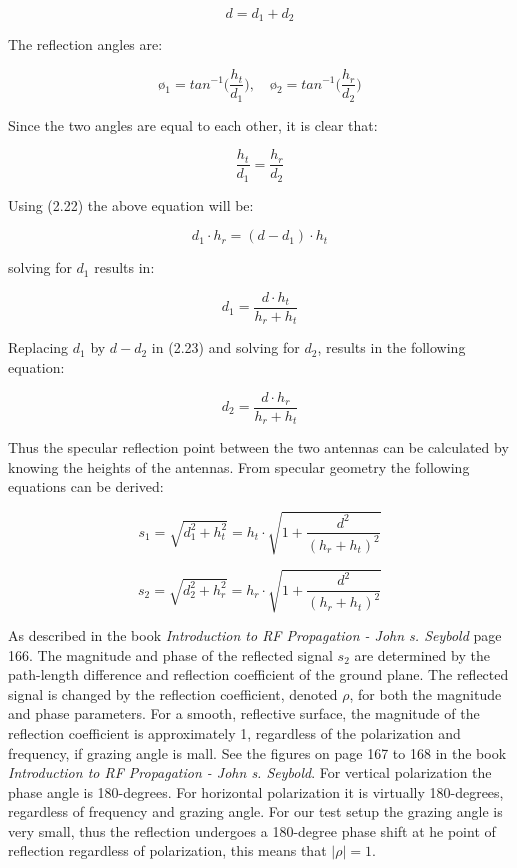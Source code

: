 \begin{equation}
  d = d_1 + d_2
\end{equation}

The reflection angles are:

$$ø_1 = tan^{-1}\Big(\frac{h_t}{d_1}\Big), \quad ø_2 = tan^{-1}\Big(\frac{h_r}{d_2}\Big)$$

Since the two angles are equal to each other, it is clear that: 

$$\frac{h_t}{d_1} = \frac{h_r}{d_2}$$

Using (2.22) the above equation will be:

\begin{equation}
  d_1 \cdot h_r = (d-d_1) \cdot h_t
\end{equation}

solving for $d_1$ results in:

\begin{equation}
  d_1 = \frac{d \cdot h_t}{h_r + h_t}
\end{equation}

Replacing $d_1$ by $d - d_2$ in (2.23) and solving for $d_2$, results in the following equation:

\begin{equation}
  d_2 = \frac{d \cdot h_r}{h_r + h_t}
\end{equation}

Thus the specular reflection point between the two antennas can be calculated by knowing the heights of the antennas. From specular geometry the following equations can be derived: 

\begin{equation}
  s_1 = \sqrt{d_1^2 + h_t^2} = h_t \cdot \sqrt{1 + \frac{d^2}{(h_r + h_t)^2}}
\end{equation}

\begin{equation}
  s_2 = \sqrt{d_2^2 + h_r^2} = h_r \cdot \sqrt{1 + \frac{d^2}{(h_r + h_t)^2}}
\end{equation}

As described in the book \textit{Introduction to RF Propagation - John s. Seybold}\cite{RFpropagation} page 166. The magnitude and phase of the reflected signal $s_2$ are determined by the path-length difference and reflection coefficient of the ground plane. The reflected signal is changed by the reflection coefficient, denoted $\rho$, for both the magnitude and phase parameters. For a smooth, reflective surface, the magnitude of the reflection coefficient is approximately 1, regardless of the polarization and frequency, if grazing angle is mall. See the figures on page 167 to 168 in the book \textit{Introduction to RF Propagation - John s. Seybold}\cite{RFpropagation}. For vertical polarization the phase angle is 180-degrees. For horizontal polarization it is virtually 180-degrees, regardless of frequency and grazing angle. For our test setup the grazing angle is very small, thus the reflection undergoes a 180-degree phase shift at he point of reflection regardless of polarization, this means that $|\rho| = 1$.

